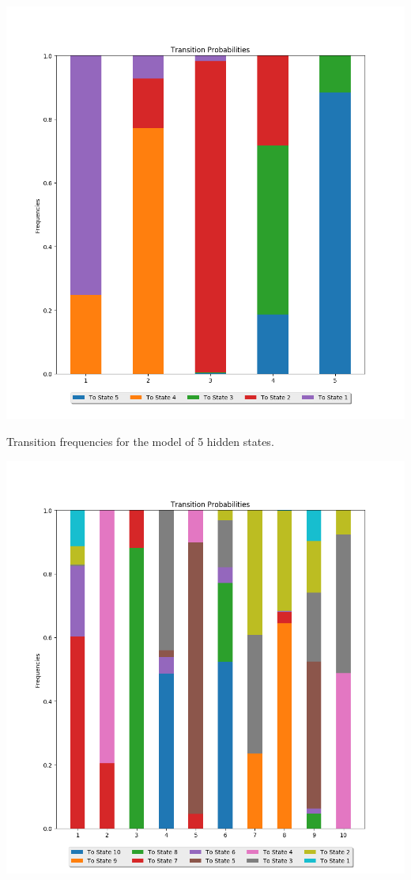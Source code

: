 \begin{center}
\includegraphics[scale=0.6]{../src/results/transitions_5}
\end{center}

Transition frequencies for the model of 5 hidden states.

\begin{center}
\includegraphics[scale=0.6]{../src/results/transitions_10}
\end{center}

